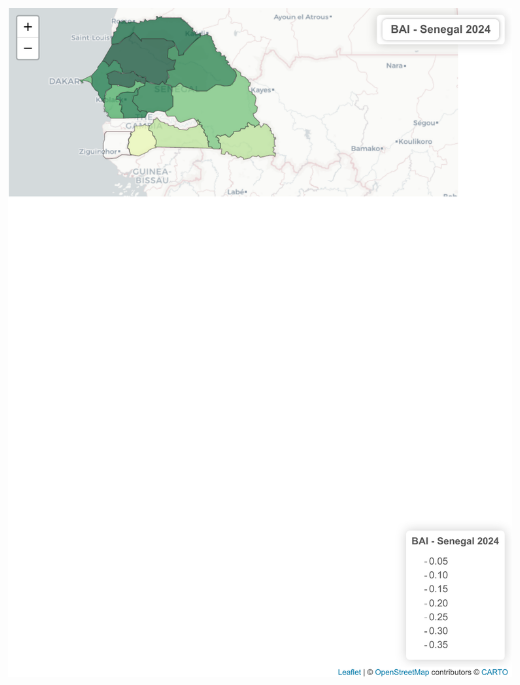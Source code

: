 \documentclass[
]{book}
\begin{document}
\includegraphics{Atlas-Spectral-Sahel_files/figure-latex/bai-cartes-1.pdf}
\end{document}
